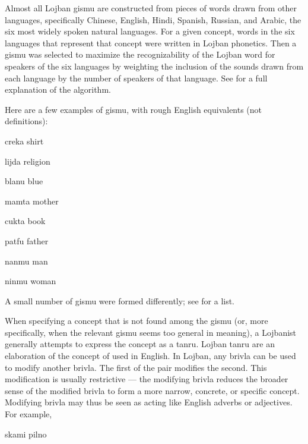 Almost all Lojban gismu are constructed from pieces of words drawn from other languages, specifically Chinese, English, Hindi, Spanish, Russian, and Arabic, the six most widely spoken natural languages. For a given concept, words in the six languages that represent that concept were written in Lojban phonetics. Then a gismu was selected to maximize the recognizability of the Lojban word for speakers of the six languages by weighting the inclusion of the sounds drawn from each language by the number of speakers of that language. See  for a full explanation of the algorithm.

Here are a few examples of gismu, with rough English equivalents (not definitions):
\begin{example}
creka\n
shirt
\end{example}

\begin{example}
lijda\n
religion
\end{example}

\begin{example}
blanu\n
blue
\end{example}

\begin{example}
mamta\n
mother
\end{example}

\begin{example}
cukta\n
book
\end{example}

\begin{example}
patfu\n
father
\end{example}

\begin{example}
nanmu\n
man
\end{example}

\begin{example}
ninmu\n
woman
\end{example}

A small number of gismu were formed differently; see  for a list.



When specifying a concept that is not found among the gismu (or, more specifically, when the relevant gismu seems too general in meaning), a Lojbanist generally attempts to express the concept as a tanru. Lojban tanru are an elaboration of the concept of  used in English. In Lojban, any brivla can be used to modify another brivla. The first of the pair modifies the second. This modification is usually restrictive --- the modifying brivla reduces the broader sense of the modified brivla to form a more narrow, concrete, or specific concept. Modifying brivla may thus be seen as acting like English adverbs or adjectives. For example,
\begin{example}
skami pilno
\end{example}

